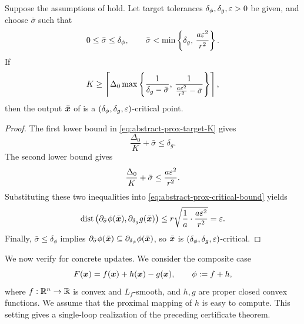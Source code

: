 \begin{theorem}
\label{thm:abstract-prox-target}
Suppose the assumptions of 
hold. Let target tolerances
$\delta_\phi,\delta_g,\varepsilon>0$ be given, and choose
$\bar\sigma$ such that
\begin{equation}
    0\le\bar\sigma\le\delta_\phi,
    \qquad
    \bar\sigma
    <
    \min\left\{
        \delta_g,\,
        \frac{a\varepsilon^2}{r^2}
    \right\}.
    \label{eq:abstract-prox-target-compatibility}
\end{equation}
If
\begin{equation}
    K
    \ge
    \left\lceil
    \Delta_0
    \max\left\{
        \frac{1}{\delta_g-\bar\sigma},\,
        \frac{1}{
            \frac{a\varepsilon^2}{r^2}
            -
            \bar\sigma
        }
    \right\}
    \right\rceil ,
    \label{eq:abstract-prox-target-K}
\end{equation}
then the output $\bar{\bm{x}}$ of
 is a
$(\delta_\phi,\delta_g,\varepsilon)$-critical point.
\end{theorem}

\begin{proof}
The first lower bound in \eqref{eq:abstract-prox-target-K} gives
\[
    \frac{\Delta_0}{K}+\bar\sigma
    \le
    \delta_g.
\]
The second lower bound gives
\[
    \frac{\Delta_0}{K}+\bar\sigma
    \le
    \frac{a\varepsilon^2}{r^2}.
\]
Substituting these two inequalities into
\eqref{eq:abstract-prox-critical-bound} yields
\[
    \operatorname{dist}
    \left(
        \partial_{\bar\sigma}\phi(\bar{\bm{x}}),
        \partial_{\delta_g}g(\bar{\bm{x}})
    \right)
    \le
    r\sqrt{
        \frac{1}{a}
        \cdot
        \frac{a\varepsilon^2}{r^2}
    }
    =
    \varepsilon .
\]
Finally, $\bar\sigma\le\delta_\phi$ implies
$\partial_{\bar\sigma}\phi(\bar{\bm{x}})
\subseteq
\partial_{\delta_\phi}\phi(\bar{\bm{x}})$, so $\bar{\bm{x}}$ is
$(\delta_\phi,\delta_g,\varepsilon)$-critical.
\end{proof}

We now verify  for concrete updates. We consider the composite case
\begin{equation}
    F(\bm{x})=f(\bm{x})+h(\bm{x})-g(\bm{x}),
    \qquad
    \phi:=f+h,
    \label{eq:composite-ps-dca-model}
\end{equation}
where $f:\mathbb{R}^n\to\mathbb{R}$ is convex and $L_f$-smooth, and $h,g$ are
proper closed convex functions. We assume that the proximal mapping of
$h$ is easy to compute. This setting gives a single-loop realization of
the preceding certificate theorem.

